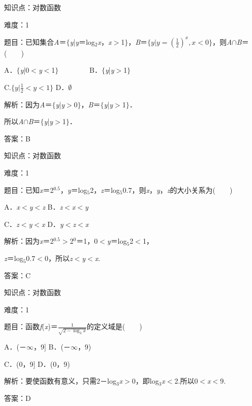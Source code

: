 \documentclass{article} %
\begin{document}
知识点：对数函数

难度：1

题目：已知集合\textit{A}＝$\mathrm{\{}$\textit{y}|\textit{y}＝log${}_{2}$\textit{x}，\textit{x}$\mathrm{>}$1$\mathrm{\}}$，\textit{B}＝$\{y|y=(\frac{1}{2})^{x},x<0\}$，则\textit{A}$\mathrm{\cap}$\textit{B}＝(　　)

A．$\mathrm{\{}$\textit{y}|0$\mathrm{<}$\textit{y}$\mathrm{<}$1$\mathrm{\}}$　　　　 B．$\mathrm{\{}$\textit{y}|\textit{y}$\mathrm{>}$1$\mathrm{\}}$

C.$\{y|\frac{1}{2}<y<1\}$   D．$\mathrm{\emptyset}$

解析：因为\textit{A}＝$\mathrm{\{}$\textit{y}|\textit{y}$\mathrm{>}$0$\mathrm{\}}$，\textit{B}＝$\mathrm{\{}$\textit{y}|\textit{y}$\mathrm{>}$1$\mathrm{\}}$．

所以\textit{A}$\mathrm{\cap}$\textit{B}＝$\mathrm{\{}$\textit{y}|\textit{y}$\mathrm{>}$1$\mathrm{\}}$．

答案：B

知识点：对数函数

难度：1

题目：已知\textit{x}＝2${}^{0.5}$，\textit{y}＝log${}_{5}$2，\textit{z}＝log${}_{5}$0.7，则\textit{x}，\textit{y}，\textit{z}的大小关系为(　　)

A．\textit{x}$\mathrm{<}$\textit{y}$\mathrm{<}$\textit{z}   B．\textit{z}$\mathrm{<}$\textit{x}$\mathrm{<}$\textit{y}

C．\textit{z}$\mathrm{<}$\textit{y}$\mathrm{<}$\textit{x}   D．\textit{y}$\mathrm{<}$\textit{z}$\mathrm{<}$\textit{x}

解析：因为\textit{x}＝2${}^{0.5}$$\mathrm{>}$2${}^{0}$＝1，0$\mathrm{<}$\textit{y}＝log${}_{5}$2$\mathrm{<}$1，

\textit{z}＝log${}_{5}$0.7$\mathrm{<}$0，所以\textit{z}$\mathrm{<}$\textit{y}$\mathrm{<}$\textit{x}.

答案：C

知识点：对数函数

难度：1

题目：函数\textit{f}(\textit{x})＝$\frac{1}{\sqrt{2-\log_3 x}}$的定义域是(　　)

A．(－$\mathrm{\infty}$，9]   B．(－$\mathrm{\infty}$，9)

C．(0，9]   D．(0，9)

解析：要使函数有意义，只需2－log${}_{3}$\textit{x}$\mathrm{>}$0，即log${}_{3}$\textit{x}$\mathrm{<}$2.所以0$\mathrm{<}$\textit{x}$\mathrm{<}$9.

答案：D
\end{document}
